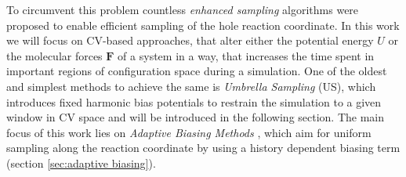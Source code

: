 To circumvent this problem countless \textit{enhanced sampling} algorithms were proposed to enable efficient sampling of the hole reaction coordinate.\autocite{jiang2010free, sugita1999replica,den2000thermodynamic, kastner2011umbrella, ciccotti2005blue, barducci2008well}
In this work we will focus on CV-based approaches, that alter either the potential energy $U$ or the molecular forces $\textbf{F}$ of a system in a way, that increases the time spent in important regions of configuration space during a simulation.
One of the oldest and simplest methods to achieve the same is \textit{Umbrella Sampling} (US)\autocite{kastner2011umbrella}, which introduces fixed harmonic bias potentials to restrain the simulation to a given window in CV space and will be introduced in the following section.
The main focus of this work lies on \textit{Adaptive Biasing Methods} \autocite{barducci2011metadynamics,comer2015adaptive, lesage2017smoothed}, which aim for uniform sampling along the reaction coordinate by using a history dependent biasing term (section \ref{sec:adaptive biasing}).

